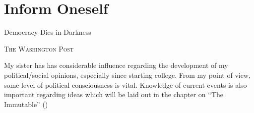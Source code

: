 \documentclass[../butidigress.tex]{subfiles}
\begin{document}
\section{Inform Oneself}
\epigraph{Democracy Dies in Darkness}{\textsc{The Washington Post}}
My sister has has considerable influence regarding the development of my political/social opinions, especially since starting college.
From my point of view, some level of political consciousness is vital.
Knowledge of current events is also important regarding ideas which will be laid out in the chapter on ``The Immutable'' (\pageref{chap:immutable})
\end{document}
